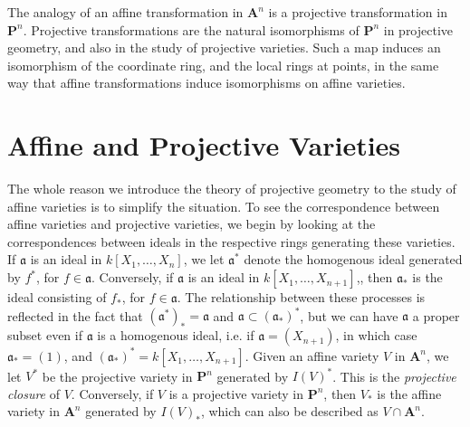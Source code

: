 The analogy of an affine transformation in $\mathbf{A}^n$ is a projective transformation in $\mathbf{P}^n$. Projective transformations are the natural isomorphisms of $\mathbf{P}^n$ in projective geometry, and also in the study of projective varieties. Such a map induces an isomorphism of the coordinate ring, and the local rings at points, in the same way that affine transformations induce isomorphisms on affine varieties.

\section{Affine and Projective Varieties}

The whole reason we introduce the theory of projective geometry to the study of affine varieties is to simplify the situation. To see the correspondence between affine varieties and projective varieties, we begin by looking at the correspondences between ideals in the respective rings generating these varieties. If $\mathfrak{a}$ is an ideal in $k[X_1, \dots, X_n]$, we let $\mathfrak{a}^*$ denote the homogenous ideal generated by $f^*$, for $f \in \mathfrak{a}$. Conversely,  if $\mathfrak{a}$ is an ideal in $k[X_1, \dots, X_{n+1}]$,, then $\mathfrak{a}_*$ is the ideal consisting of $f_*$, for $f \in \mathfrak{a}$. The relationship between these processes is reflected in the fact that $(\mathfrak{a}^*)_* = \mathfrak{a}$ and $\mathfrak{a} \subset (\mathfrak{a}_*)^*$, but we can have $\mathfrak{a}$ a proper subset even if $\mathfrak{a}$ is a homogenous ideal, i.e. if $\mathfrak{a} = (X_{n+1})$, in which case $\mathfrak{a}_* = (1)$, and $(\mathfrak{a}_*)^* = k[X_1, \dots, X_{n+1}]$. Given an affine variety $V$ in $\mathbf{A}^n$, we let $V^*$ be the projective variety in $\mathbf{P}^n$ generated by $I(V)^*$. This is the \emph{projective closure} of $V$. Conversely, if $V$ is a projective variety in $\mathbf{P}^n$, then $V_*$ is the affine variety in $\mathbf{A}^n$ generated by $I(V)_*$, which can also be described as $V \cap \mathbf{A}^n$.

